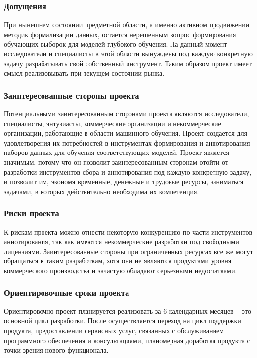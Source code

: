 \documentclass[../main]{subfiles}
\begin{document}
\subsubsection{Допущения}
При нынешнем состоянии предметной области, а именно активном продвижении методик формализации данных, остается нерешенным вопрос формирования обучающих выборок для моделей глубокого обучения. На данный момент исследователи и специалисты в этой области вынуждены под каждую конкретную задачу разрабатывать свой собственный инструмент. Таким образом проект имеет смысл реализовывать при текущем состоянии рынка.

\subsubsection{Заинтересованные стороны проекта}
Потенциальными заинтересованным сторонами проекта являются исследователи, специалисты, энтузиасты, коммерческие организации и некоммерческие организации, работающие в области машинного обучения. Проект создается для удовлетворения их потребностей в инструментах формирования и аннотирования наборов данных для обучения соответствующих моделей. Проект является значимым, потому что он позволит заинтересованным сторонам отойти от разработки инструментов сбора и аннотирования под каждую конкретную задачу, и позволит им, экономя временные, денежные и трудовые ресурсы, заниматься задачами, в которых действительно необходима их компетенция.

\subsubsection{Риски проекта}
К рискам проекта можно отнести некоторую конкуренцию по части инструментов аннотирования, так как имеются некоммерческие разработки под свободными лицензиями. Заинтересованные стороны при ограниченных ресурсах все же могут обращаться к таким разработкам, хотя они не являются продуктами уровня коммерческого производства и зачастую обладают серьезными недостатками. 

\subsubsection{Ориентировочные сроки проекта}
Ориентировочно проект планируется реализовать за 6 календарных месяцев -- это основной цикл разработки. После осуществляется переход на цикл поддержки продукта, предоставлении сервисных услуг, связанных с обслуживанием программного обеспечения и консультациями, планомерная доработка продукта с точки зрения нового функционала.
\end{document}
